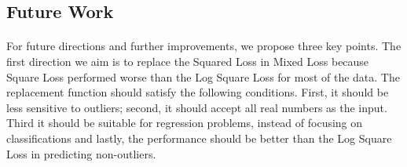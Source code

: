 \documentclass[runningheads]{llncs}
\begin{document}
\subsection{Future Work}


\paragraph{} For future directions and further improvements, we propose three key points. The first direction we aim is to replace the Squared Loss in Mixed Loss because Square Loss performed worse than the Log Square Loss for most of the data. The replacement function should satisfy the following conditions. First, it should be less sensitive to outliers; second, it should accept all real numbers as the input. Third it should be suitable for regression problems, instead of focusing on classifications and lastly, the performance should be better than the Log Square Loss in predicting non-outliers.




%
%

%
%
%
% 
% 
%
\end{document}
